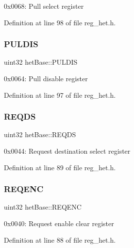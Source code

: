 0x0068\+: Pull select register 

Definition at line 98 of file reg\+\_\+het.\+h.

\mbox{\label{structhetBase_a88384c2f85bff01e2f415fcb7d914372}} 
\subsubsection{\texorpdfstring{P\+U\+L\+D\+IS}{PULDIS}}
{\footnotesize\ttfamily uint32 het\+Base\+::\+P\+U\+L\+D\+IS}

0x0064\+: Pull disable register 

Definition at line 97 of file reg\+\_\+het.\+h.

\mbox{\label{structhetBase_add9d304ee723a0b062ec37aa599bf41f}} 
\subsubsection{\texorpdfstring{R\+E\+Q\+DS}{REQDS}}
{\footnotesize\ttfamily uint32 het\+Base\+::\+R\+E\+Q\+DS}

0x0044\+: Request destination select register 

Definition at line 89 of file reg\+\_\+het.\+h.

\mbox{\label{structhetBase_ae3e296ce5b4f4994470b9d58b4642a98}} 
\subsubsection{\texorpdfstring{R\+E\+Q\+E\+NC}{REQENC}}
{\footnotesize\ttfamily uint32 het\+Base\+::\+R\+E\+Q\+E\+NC}

0x0040\+: Request enable clear register 

Definition at line 88 of file reg\+\_\+het.\+h.

\mbox{\label{structhetBase_a7787663f8982af9bf37786374fefc57d}} 
